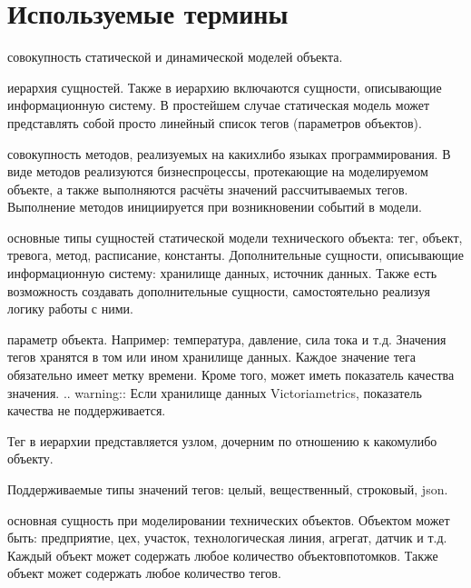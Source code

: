 \documentclass[a4paper,10pt,russian]{sphinxmanual}
\begin{document}
\sphinxstepscope


\chapter{Используемые термины}
\label{\detokenize{terms:id1}}\label{\detokenize{terms::doc}}
\sphinxAtStartPar
{} \sphinxhyphen{} совокупность статической и
динамической моделей объекта.

\sphinxAtStartPar
{} \sphinxhyphen{} иерархия сущностей. Также в иерархию
включаются сущности, описывающие информационную систему.
В простейшем случае статическая модель может представлять собой просто
линейный список тегов (параметров объектов).

\sphinxAtStartPar
{} \sphinxhyphen{} совокупность методов, реализуемых на каких\sphinxhyphen{}либо
языках программирования. В виде методов реализуются бизнес\sphinxhyphen{}процессы,
протекающие на моделируемом объекте, а также выполняются расчёты значений
рассчитываемых тегов. Выполнение методов инициируется при возникновении
событий в модели.

\sphinxAtStartPar
{} \sphinxhyphen{} основные типы сущностей статической модели технического
объекта: тег, объект, тревога, метод, расписание, константы.
Дополнительные сущности, описывающие информационную систему: хранилище данных,
источник данных.
Также есть возможность создавать дополнительные сущности, самостоятельно
реализуя логику работы с ними.

\sphinxAtStartPar
{} \sphinxhyphen{} параметр объекта. Например: температура, давление, сила тока и т.д.
Значения тегов хранятся в том или ином хранилище данных. Каждое значение тега
обязательно имеет метку времени. Кроме того, может иметь показатель качества
значения.
.. warning:: Если хранилище данных \sphinxhyphen{} Victoriametrics, показатель качества
не поддерживается.

\sphinxAtStartPar
Тег в иерархии представляется узлом, дочерним по отношению к какому\sphinxhyphen{}либо
объекту.

\sphinxAtStartPar
Поддерживаемые типы значений тегов: целый, вещественный, строковый, json.

\sphinxAtStartPar
{} \sphinxhyphen{} основная сущность при моделировании технических объектов.
Объектом может быть: предприятие, цех, участок, технологическая линия, агрегат,
датчик и т.д. Каждый объект может содержать любое количество объектов\sphinxhyphen{}потомков.
Также объект может содержать любое количество тегов.
\end{document}
